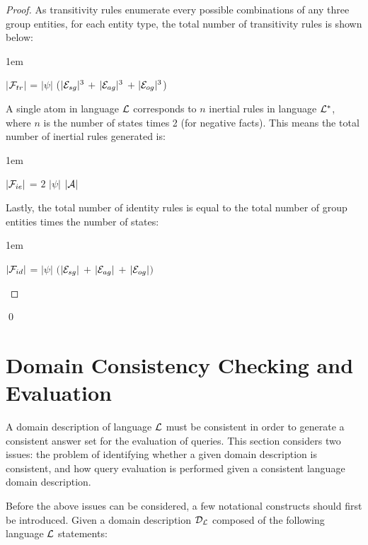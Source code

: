 \documentclass[glov2,twocolumn,final]{svjour2}
\newenvironment{vproof}
  {\begin{proof}\hspace{0.1em}}
  {\end{proof}\qed}
\newenvironment{vquote}
  {\begin{list}{}{\leftmargin 1em}\item[]}
  {\end{list}}
\begin{document}
\begin{vproof}
          As transitivity rules enumerate every possible combinations of any
          three group entities, for each entity type, the total number of
          transitivity rules is shown below:

          \begin{vquote}
            $|$${\cal F}_{tr}$$|$ =
            $|\psi|$
            ($|{\cal E}_{sg}|^{3}$ $+$
            $|{\cal E}_{ag}|^{3}$ $+$
            $|{\cal E}_{og}|^{3}$)
          \end{vquote}

          A single atom in language ${\cal L}$ corresponds to $n$ inertial
          rules in language ${\cal L}^{*}$, where $n$ is the number of states
          times 2 (for negative facts). This means the total number of
          inertial rules generated is:

          \begin{vquote}
            $|{\cal F}_{ie}|$ = $2$ $|\psi|$ $|{\cal A}|$
          \end{vquote}

          Lastly, the total number of identity rules is equal to the total
          number of group entities times the number of states:

          \begin{vquote}
            $|{\cal F}_{id}|$ =
            $|\psi|$
            $($$|{\cal E}_{sg}|$ $+$ $|{\cal E}_{ag}|$ $+$ $|{\cal E}_{og}|$$)$
          \end{vquote}
        \end{vproof}

  \section{Domain Consistency Checking and Evaluation}
    \label{sec-cons}

    A domain description of language ${\cal L}$ must be consistent in order to
    generate a consistent answer set for the evaluation of queries. This
    section considers two issues: the problem of identifying whether a given
    domain description is consistent, and how query evaluation is performed
    given a consistent language domain description.

    Before the above issues can be considered, a few notational constructs
    should first be introduced. Given a domain description ${\cal D_{L}}$
    composed of the following language ${\cal L}$ statements:
\end{document}
